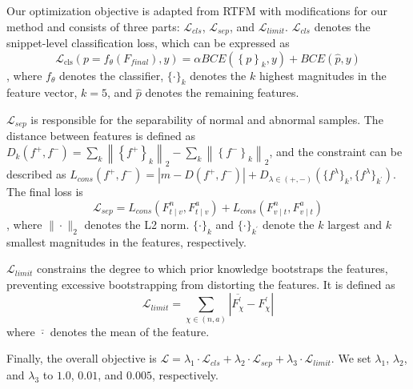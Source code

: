 Our optimization objective is adapted from RTFM\citep{a-tian2021weakly} with modifications for our method and consists of three parts: $\mathcal{L}_{cls}$, $\mathcal{L}_{sep}$, and $\mathcal{L}_{limit}$. $\mathcal{L}_{cls}$ denotes the snippet-level classification loss, which can be expressed as $$\mathcal{L}_{\text{cls}}(p = f_{\theta}(F_{final}), y) = \alpha BCE(\left \{ p  \right \}_{k}, y) + BCE(\hat{p}, y)$$, where $f_{\theta}$ denotes the classifier, $\{ \cdot \}_{k}$ denotes the $k$ highest magnitudes in the feature vector, $k=5$, and $\hat{p}$ denotes the remaining features.

$\mathcal{L}_{sep}$ is responsible for the separability of normal and abnormal samples. The distance between features is defined as $D_{k}(f^{+},f^{-}) = \sum_{k} \left \| \left \{ f^{+} \right \}_k  \right \|_{2} - \sum_{k} \left \| \left \{ f^{-} \right \}_k  \right \|_{2}$, and the constraint can be described as $L_{cons}(f^{+}, f^{-}) = \left | m - D(f^{+}, f^{-}) \right | + D_{\lambda \in (+,-)}(\{ f^{\lambda } \}_{k}, \{ f^{\lambda } \}_{k^{'}})$. The final loss is $$\mathcal{L}_{sep} = L_{cons}(F_{t \mid v}^{n}, F_{t \mid v}^{a}) + L_{cons}(F_{v \mid t}^{n}, F_{v \mid t}^{a})$$, where $\|\cdot\|_2$ denotes the L2 norm. $\{ \cdot \}_{k}$ and $\{ \cdot \}_{k^{'}}$ denote the $k$ largest and $k$ smallest magnitudes in the features, respectively.

$\mathcal{L}_{limit}$ constrains the degree to which prior knowledge bootstraps the features, preventing excessive bootstrapping from distorting the features. It is defined as $$\mathcal{L}_{limit} = \sum_{\chi \in (n,a)}^{} \left | \overline{F_{\chi}^{'}} - F_{\chi}^{'}  \right |$$ where $\overline{\cdot}$ denotes the mean of the feature. 

Finally, the overall objective is $\mathcal{L} = \lambda_1 \cdot  \mathcal{L}_{cls} + \lambda_2 \cdot  \mathcal{L}_{sep} + \lambda_3 \cdot  \mathcal{L}_{limit}$. We set $\lambda_1$, $\lambda_2$, and $\lambda_3$ to $1.0$, $0.01$, and $0.005$, respectively.
